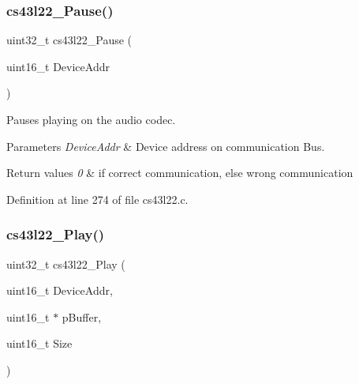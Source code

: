 \mbox{\label{group___c_s43_l22___private___functions_gafc49ea6a76539430cd303849b60ae38d}} 
\subsubsection{\texorpdfstring{cs43l22\+\_\+\+Pause()}{cs43l22\_Pause()}}
{\footnotesize\ttfamily uint32\+\_\+t cs43l22\+\_\+\+Pause (\begin{DoxyParamCaption}\item[{uint16\+\_\+t}]{Device\+Addr }\end{DoxyParamCaption})}



Pauses playing on the audio codec. 


\begin{DoxyParams}{Parameters}
{\em Device\+Addr} & Device address on communication Bus. \\
\hline
\end{DoxyParams}

\begin{DoxyRetVals}{Return values}
{\em 0} & if correct communication, else wrong communication \\
\hline
\end{DoxyRetVals}


Definition at line 274 of file cs43l22.\+c.

\mbox{\label{group___c_s43_l22___private___functions_ga1a210c3782b3d56db00565d4699f4c89}} 
\subsubsection{\texorpdfstring{cs43l22\+\_\+\+Play()}{cs43l22\_Play()}}
{\footnotesize\ttfamily uint32\+\_\+t cs43l22\+\_\+\+Play (\begin{DoxyParamCaption}\item[{uint16\+\_\+t}]{Device\+Addr,  }\item[{uint16\+\_\+t $\ast$}]{p\+Buffer,  }\item[{uint16\+\_\+t}]{Size }\end{DoxyParamCaption})}



